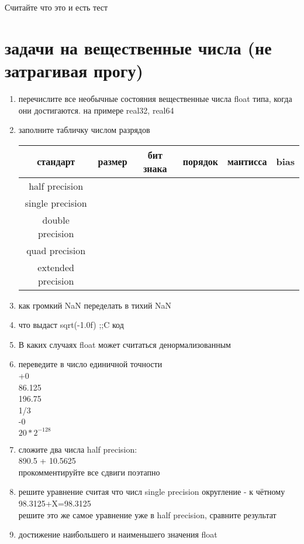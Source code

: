 \documentclass[a4paper,10pt]{article}
\begin{document}
Считайте что это и есть тест

\section*{задачи на вещественные числа (не затрагивая прогу)}
\begin{enumerate}
    \item перечислите все необычные состояния вещественные числа float типа, когда они достигаются. на примере real32, real64
    \item заполните табличку числом разрядов \\
    \begin{tabular}{|c|c|c|c|c|c|}
        \hline
        стандарт& размер & бит знака & порядок & мантисса & bias \\
        \hline
        half precision & & & & \\
        \hline
        single precision & & & & \\
        \hline
        double precision & & & & \\
        \hline
        quad precision & & & & \\
        \hline
        extended precision & & & & \\
        \hline
    \end{tabular}
    \item как громкий NaN переделать в тихий NaN
    \item что выдаст sqrt(-1.0f) ;;C код
    \item В каких случаях float может считаться денормализованным
    \item переведите в число единичной точности\\
    +0 \\ 
    86.125 \\
    196.75 \\
    1/3 \\
    -0 \\
    $20*2^{-128}$ \\
    \item сложите два числа half precision: \\
    890.5 + 10.5625\\
    прокомментируйте все сдвиги поэтапно \\
    \item решите уравнение считая что числ single precision округление - к чётному
    98.3125+X=98.3125\\
    решите это же самое уравнение уже в half precision, сравните результат \\
    \item достижение наибольшего и наименьшего значения float \\
\end{enumerate}
\end{document}
